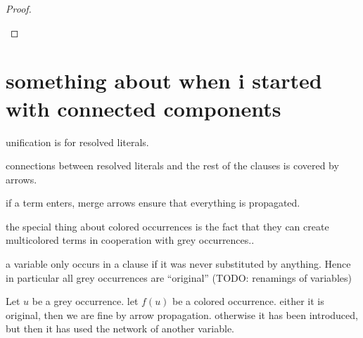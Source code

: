 \documentclass[,%
	paper=a4,%
	DIV11, %
	twoside=false,%
	liststotoc,
	bibtotoc,
	draft=false,%
	numbers=noendperiod
]{scrartcl}
\begin{document}
\begin{proof}
\begin{description}
\begin{comment}
					\item $t$ is a $\Gamma$-term which does not contain a $\Delta$-term.
						$t$ is however an abstraction of $\newgam\occ{\delta_i}$, so it contains at least one variable which is substituted by a term $s$.
						Hence by Remark~\substremarkref, we can assume that an appropriate arrow pointing to $t$ exists.

						We distinguish based on the shape $s$:
						\begin{itemize}
							\item $s$ is a grey or $\Delta$-colored term containing a $\Delta$-term.
								Then a $\Delta$-term is introduced into a $\Gamma$-term by means of unification, so by the respective case of the proof, there is an arrow from an appropriate lifting variable to~$t$.

							\item $s$ is a multicolored $\Gamma$-term.
								Then by Remark~\substremarkref, we can assume that an appropriate arrow pointing to $t$ exists.
						\end{itemize}
					\item $t$ is a $\Gamma$-term containing a $\Delta$-term.
				\end{itemize}
			\end{comment}


	\end{description}

\end{proof}

\section*{something about when i started with connected components}

unification is for resolved literals.

connections between resolved literals and the rest of the clauses is covered by arrows.

if a term enters, merge arrows ensure that everything is propagated.

the special thing about colored occurrences is the fact that they can create multicolored terms in cooperation with grey occurrences..

a variable only occurs in a clause if it was never substituted by anything. Hence in particular all grey occurrences are ``original'' (TODO: renamings of variables)

Let $u$ be a grey occurrence.
let $f(u)$ be a colored occurrence.
either it is original, then we are fine by arrow propagation.
otherwise it has been introduced, but then it has used the network of another variable.
\end{document}
